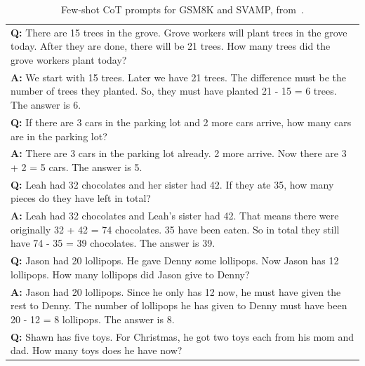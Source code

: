 \documentclass{article} %
\begin{document}
\begin{table}[h]
    \caption{
    Few-shot CoT prompts for GSM8K and SVAMP, from~\cite{Wei2022ChainOT}.
    }
    \centering
    \small
    \begin{tabular}{p{13.5cm}}
        \toprule
        \textbf{Q:} There are 15 trees in the grove. Grove workers will plant trees in the grove today. After they are done, there will be 21 trees. How many trees did the grove workers plant today? \\
        \vspace{-1mm}
        \textbf{A:} We start with 15 trees. Later we have 21 trees. The difference must be the number of trees they planted. So, they must have planted 21 - 15 = 6 trees. The answer is 6. \\
        \vspace{0mm}
        \textbf{Q:} If there are 3 cars in the parking lot and 2 more cars arrive, how many cars are in the parking lot? \\
        \vspace{-1mm}
        \textbf{A:} There are 3 cars in the parking lot already. 2 more arrive. Now there are 3 + 2 = 5 cars. The answer is 5. \\
        \vspace{0mm}
        \textbf{Q:} Leah had 32 chocolates and her sister had 42. If they ate 35, how many pieces do they have left in total? \\
        \vspace{-1mm}
        \textbf{A:} Leah had 32 chocolates and Leah's sister had 42. That means there were originally 32 + 42 = 74 chocolates. 35 have been eaten. So in total they still have 74 - 35 = 39 chocolates. The answer is 39. \\
        \vspace{0mm}
        \textbf{Q:} Jason had 20 lollipops. He gave Denny some lollipops. Now Jason has 12 lollipops. How many lollipops did Jason give to Denny? \\
        \vspace{-1mm}
        \textbf{A:} Jason had 20 lollipops. Since he only has 12 now, he must have given the rest to Denny. The number of lollipops he has given to Denny must have been 20 - 12 = 8 lollipops. The answer is 8. \\
        \vspace{0mm}
        \textbf{Q:} Shawn has five toys. For Christmas, he got two toys each from his mom and dad. How many toys does he have now? \\

\end{tabular}
\end{table}
\end{document}
